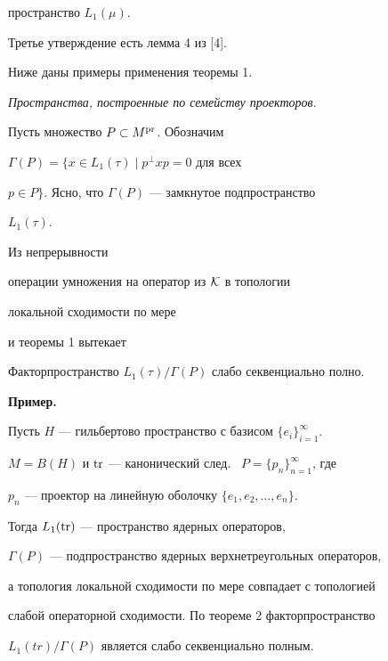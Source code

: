 пространство $L_1 (\mu )$.


Третье утверждение есть лемма 4 из [4].





Ниже даны примеры применения теоремы 1.


\medskip





{\it Пространства, построенные по семейству проекторов.}


Пусть множество $P\subset M^{\operatorname{pr}}$. Обозначим


$\Gamma(P)= \{ x\in L_{1}(\tau)\mid p^{\perp}xp=0$ для всех


$p\in P \}$. Ясно, что $\Gamma(P)$ --- замкнутое подпространство


$L_{1}({\tau})$.


Из непрерывности


операции умножения на оператор из ${\cal K}$ в топологии


локальной сходимости по мере


и теоремы 1 вытекает





\begin{thm}


Факторпространство $L_{1}(\tau)/\Gamma(P)$ слабо секвенциально полно.


\end{thm}





{\bf Пример.}


Пусть $H$ --- гильбертово пространство с базисом $\{e_{i}\}_{i=1}^{\infty}$.


$M=B(H)$ и $\operatorname{tr}$ --- канонический след. \ $P=\{p_{n}\}_{n=1}^{\infty}$, где


$p_{n}$ --- проектор на линейную оболочку $\{e_{1},e_{2},\dotsc,e_{n}\}$.


Тогда $L_{1}(\operatorname{tr})$ --- пространство ядерных операторов,


$\Gamma(P)$ --- подпространство ядерных верхнетреугольных операторов,


а топология локальной сходимости по мере совпадает с топологией


слабой операторной сходимости. По теореме 2 факторпространство


$L_{1}(tr)/{\Gamma}(P)$ является слабо секвенциально полным.


\medskip





